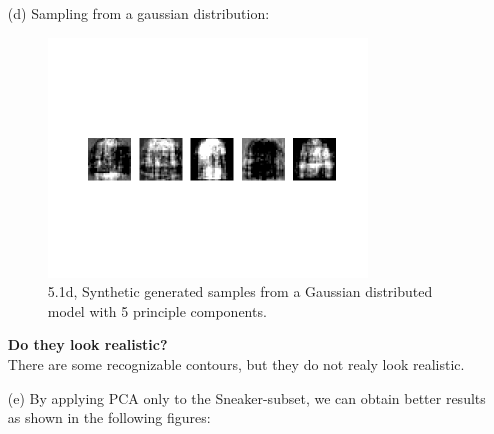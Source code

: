 \documentclass [a4paper, 11pt] {article}
\begin{document}
\begin{enumerate}
\newpage
\item[(d)]
Sampling from a gaussian distribution:\\
\begin{figure}[!h]
	\centering
	\includegraphics[width=0.8\textwidth]{pca/samples.png}
	\caption{ 5.1d, Synthetic generated samples from a Gaussian distributed model with 5 principle components.}
\end{figure}

\textbf{Do they look realistic?}\\
There are some recognizable contours, but they do not realy look realistic.

\newpage
\item[(e)]
By applying PCA only to the Sneaker-subset, we can obtain better results as shown in the following figures:


\end{enumerate}
\end{document}
